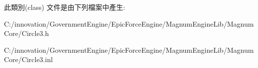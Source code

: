 此類別(class) 文件是由下列檔案中產生\+:\begin{DoxyCompactItemize}
\item 
C\+:/innovation/\+Government\+Engine/\+Epic\+Force\+Engine/\+Magnum\+Engine\+Lib/\+Magnum\+Core/Circle3.\+h\item 
C\+:/innovation/\+Government\+Engine/\+Epic\+Force\+Engine/\+Magnum\+Engine\+Lib/\+Magnum\+Core/Circle3.\+inl\end{DoxyCompactItemize}
